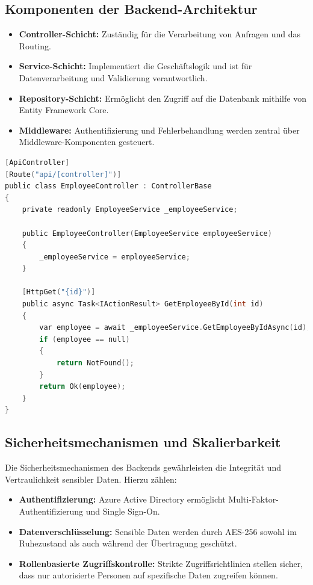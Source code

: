 \subsection{Komponenten der Backend-Architektur}
\begin{itemize}
    \item \textbf{Controller-Schicht:} Zuständig für die Verarbeitung von Anfragen und das Routing.
    \item \textbf{Service-Schicht:} Implementiert die Geschäftslogik und ist für Datenverarbeitung und Validierung verantwortlich.
    \item \textbf{Repository-Schicht:} Ermöglicht den Zugriff auf die Datenbank mithilfe von Entity Framework Core.
    \item \textbf{Middleware:} Authentifizierung und Fehlerbehandlung werden zentral über Middleware-Komponenten gesteuert.
\end{itemize}

\begin{lstlisting}[language=C, caption=Beispiel eines .NET Core Controllers, label=lst:dotnet_controller]
[ApiController]
[Route("api/[controller]")]
public class EmployeeController : ControllerBase
{
    private readonly EmployeeService _employeeService;

    public EmployeeController(EmployeeService employeeService)
    {
        _employeeService = employeeService;
    }

    [HttpGet("{id}")]
    public async Task<IActionResult> GetEmployeeById(int id)
    {
        var employee = await _employeeService.GetEmployeeByIdAsync(id);
        if (employee == null)
        {
            return NotFound();
        }
        return Ok(employee);
    }
}
\end{lstlisting}

\subsection{Sicherheitsmechanismen und Skalierbarkeit}
Die Sicherheitsmechanismen des Backends gewährleisten die Integrität und Vertraulichkeit sensibler Daten. Hierzu zählen:
\begin{itemize}
    \item \textbf{Authentifizierung:} Azure Active Directory ermöglicht Multi-Faktor-Authentifizierung und Single Sign-On.
    \item \textbf{Datenverschlüsselung:} Sensible Daten werden durch AES-256 sowohl im Ruhezustand als auch während der Übertragung geschützt.
    \item \textbf{Rollenbasierte Zugriffskontrolle:} Strikte Zugriffsrichtlinien stellen sicher, dass nur autorisierte Personen auf spezifische Daten zugreifen können.
\end{itemize}


